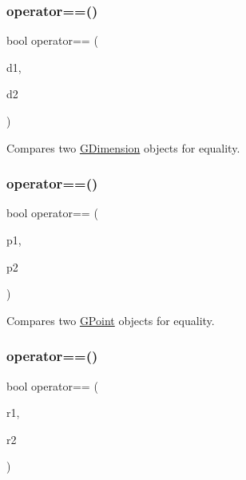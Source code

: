 \mbox{\label{namespacesgl_a6bdb9d07a69c8f061d887e6f24750640}} 
\subsubsection{\texorpdfstring{operator==()}{operator==()}\hspace{0.1cm}{\footnotesize\ttfamily [1/4]}}
{\footnotesize\ttfamily bool operator== (\begin{DoxyParamCaption}\item[{const \mbox{\hyperlink{structsgl_1_1GDimension}{G\+Dimension}} \&}]{d1,  }\item[{const \mbox{\hyperlink{structsgl_1_1GDimension}{G\+Dimension}} \&}]{d2 }\end{DoxyParamCaption})}



Compares two \mbox{\hyperlink{structsgl_1_1GDimension}{G\+Dimension}} objects for equality. 

\mbox{\label{namespacesgl_a128ff5199debc26d8f040bbd46f40a67}} 
\subsubsection{\texorpdfstring{operator==()}{operator==()}\hspace{0.1cm}{\footnotesize\ttfamily [2/4]}}
{\footnotesize\ttfamily bool operator== (\begin{DoxyParamCaption}\item[{const \mbox{\hyperlink{structsgl_1_1GPoint}{G\+Point}} \&}]{p1,  }\item[{const \mbox{\hyperlink{structsgl_1_1GPoint}{G\+Point}} \&}]{p2 }\end{DoxyParamCaption})}



Compares two \mbox{\hyperlink{structsgl_1_1GPoint}{G\+Point}} objects for equality. 

\mbox{\label{namespacesgl_a83a32754b7097b7c484607635114ce5e}} 
\subsubsection{\texorpdfstring{operator==()}{operator==()}\hspace{0.1cm}{\footnotesize\ttfamily [3/4]}}
{\footnotesize\ttfamily bool operator== (\begin{DoxyParamCaption}\item[{const \mbox{\hyperlink{structsgl_1_1GRectangle}{G\+Rectangle}} \&}]{r1,  }\item[{const \mbox{\hyperlink{structsgl_1_1GRectangle}{G\+Rectangle}} \&}]{r2 }\end{DoxyParamCaption})}



